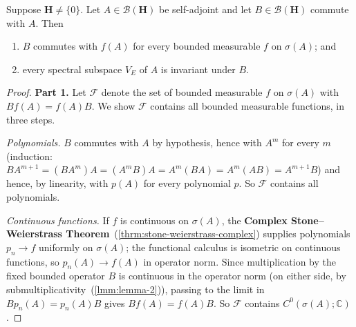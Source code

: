 \begin{proposition}
    \label{prpstn:hall-7.16}
    \leanok
    Suppose $\mathbf{H} \ne \{0\}$. Let $A \in \mathcal{B}(\mathbf{H})$ be self-adjoint and let $B \in \mathcal{B}(\mathbf{H})$ commute with $A$. Then
    \begin{enumerate}
        \item $B$ commutes with $f(A)$ for every bounded measurable $f$ on $\sigma(A)$; and
        \item every spectral subspace $V_E$ of $A$ is invariant under $B$.
    \end{enumerate}
\end{proposition}
\begin{proof}
    \leanok
\textbf{Part 1.} Let $\mathcal{F}$ denote the set of bounded measurable $f$ on $\sigma(A)$ with $Bf(A) = f(A)B$. We show $\mathcal{F}$ contains all bounded measurable functions, in three steps.

\textit{Polynomials.} $B$ commutes with $A$ by hypothesis, hence with $A^m$ for every $m$ (induction: $BA^{m+1} = (BA^m)A = (A^mB)A = A^m(BA) = A^m(AB) = A^{m+1}B$) and hence, by linearity, with $p(A)$ for every polynomial $p$. So $\mathcal{F}$ contains all polynomials.

\textit{Continuous functions.} If $f$ is continuous on $\sigma(A)$, the \textbf{Complex Stone–Weierstrass Theorem}~(\ref{thrm:stone-weierstrass-complex}) supplies polynomials $p_n \to f$ uniformly on $\sigma(A)$; the functional calculus is isometric on continuous functions, so $p_n(A) \to f(A)$ in operator norm. Since multiplication by the fixed bounded operator $B$ is continuous in the operator norm (on either side, by submultiplicativity~(\ref{lmm:lemma-2})), passing to the limit in $Bp_n(A) = p_n(A)B$ gives $Bf(A) = f(A)B$. So $\mathcal{F}$ contains $C^0(\sigma(A);\mathbb{C})$.


\end{proof}
